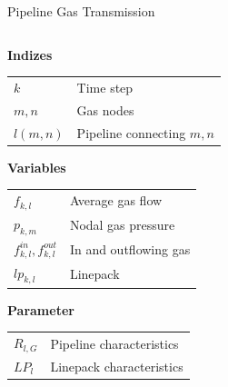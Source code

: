 \documentclass[aspectratio=169]{beamer}
\begin{document}
\begin{frame}{Pipeline Gas Transmission}
\begin{columns}
\begin{column}{.587\textwidth}
\begin{minipage}[t]{.6\textwidth}
            \end{minipage}
            \hfill
            \begin{minipage}[b]{.37\textwidth}
                \begin{coloredblock}[grey]
                    \tiny
                    \textbf{Indizes}\\[.2cm]
                    \begin{tabular}{@{}p{1.5cm} l@{}}
                        $k$ & Time step \\
                        $m,n$ & Gas nodes \\
                        $l(m,n)$ & Pipeline connecting $m,n$ \\
                    \end{tabular}
                    
                    \vspace{0.5cm}
                    
                    \textbf{Variables}\\[0.2cm]
                    \begin{tabular}{@{}p{1.5cm} l@{}}
                        $f_{k,l}$ & Average gas flow \\
                        $p_{k,m}$ & Nodal gas pressure \\
                        $f_{k,l}^{in},f_{k,l}^{out}$ & In and outflowing gas \\
                        $lp_{k,l}$ & Linepack \\
                    \end{tabular}
                    
                    \vspace{0.5cm}
                    
                    \textbf{Parameter}\\[0.2cm]
                    \begin{tabular}{@{}p{1.5cm} l@{}}
                        $R_{l,G}$ & Pipeline characteristics \\
                        $LP_l$ & Linepack characteristics \\
                    \end{tabular}
                \end{coloredblock}
            \end{minipage}
        \end{column}
    \end{columns}

\end{frame}
\end{document}
